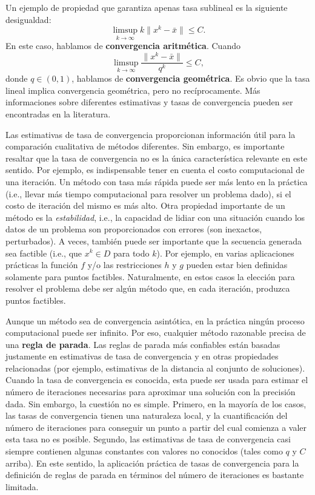 Un ejemplo de propiedad que garantiza apenas tasa sublineal es la siguiente desigualdad:
\[
    \limsup_{k \to \infty} k\|x^k - \bar{x}\| \le C.
\]
En este caso, hablamos de \textbf{convergencia aritmética}. Cuando
\[
    \limsup_{k \to \infty} \frac{\|x^k - \bar{x}\|}{q^k} \le C,
\]
donde $q \in (0, 1)$, hablamos de \textbf{convergencia geométrica}. Es obvio que la tasa lineal implica convergencia geométrica, pero no recíprocamente.
Más informaciones sobre diferentes estimativas y tasas de convergencia pueden ser encontradas en la literatura.

Las estimativas de tasa de convergencia proporcionan información útil para la comparación cualitativa de métodos diferentes. Sin embargo, es importante resaltar que la tasa de convergencia no es la única característica relevante en este sentido. Por ejemplo, es indispensable tener en cuenta el costo computacional de una iteración. Un método con tasa más rápida puede ser más lento en la práctica (i.e., llevar más tiempo computacional para resolver un problema dado), si el costo de iteración del mismo es más alto. Otra propiedad importante de un método es la \textit{estabilidad}, i.e., la capacidad de lidiar con una situación cuando los datos de un problema son proporcionados con errores (son inexactos, perturbados). 
A veces, también puede ser importante que la secuencia generada sea factible (i.e., que $x^k \in D$ para todo $k$). Por ejemplo, en varias aplicaciones prácticas la función $f$ y/o las restricciones $h$ y $g$ pueden estar bien definidas solamente para puntos factibles. Naturalmente, en estos casos la elección para resolver el problema debe ser algún método que, en cada iteración, produzca puntos factibles.

Aunque un método sea de convergencia asintótica, en la práctica ningún proceso computacional puede ser infinito. Por eso, cualquier método razonable precisa de una \textbf{regla de parada}. Las reglas de parada más confiables están basadas justamente en estimativas de tasa de convergencia y en otras propiedades relacionadas (por ejemplo, estimativas de la distancia al conjunto de soluciones). Cuando la tasa de convergencia es conocida, esta puede ser usada para estimar el número de iteraciones necesarias para aproximar una solución con la precisión dada. Sin embargo, la cuestión no es simple. Primero, en la mayoría de los casos, las tasas de convergencia tienen una naturaleza local, y la cuantificación del número de iteraciones para conseguir un punto a partir del cual comienza a valer esta tasa no es posible. Segundo, las estimativas de tasa de convergencia casi siempre contienen algunas constantes con valores no conocidos (tales como $q$ y $C$ arriba). En este sentido, la aplicación práctica de tasas de convergencia para la definición de reglas de parada en términos del número de iteraciones es bastante limitada.

